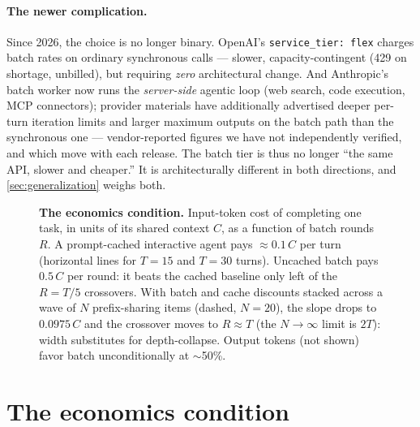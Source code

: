 \documentclass[11pt]{article}
\begin{document}
\paragraph{The newer complication.} Since 2026, the choice is no longer binary. OpenAI's \texttt{service\_tier:\,flex} charges batch rates on ordinary synchronous calls --- slower, capacity-contingent (429 on shortage, unbilled), but requiring \emph{zero} architectural change. And Anthropic's batch worker now runs the \emph{server-side} agentic loop (web search, code execution, MCP connectors); provider materials have additionally advertised deeper per-turn iteration limits and larger maximum outputs on the batch path than the synchronous one --- vendor-reported figures we have not independently verified, and which move with each release. The batch tier is thus no longer ``the same API, slower and cheaper.'' It is architecturally different in both directions, and \cref{sec:generalization} weighs both.

\begin{figure}[!htbp]
\centering

\caption{\textbf{The economics condition.} Input-token cost of completing one task, in units of its shared context $C$, as a function of batch rounds $R$. A prompt-cached interactive agent pays $\approx 0.1\,C$ per turn (horizontal lines for $T{=}15$ and $T{=}30$ turns). Uncached batch pays $0.5\,C$ per round: it beats the cached baseline only left of the $R{=}T/5$ crossovers. With batch and cache discounts stacked across a wave of $N$ prefix-sharing items (dashed, $N{=}20$), the slope drops to $0.0975\,C$ and the crossover moves to $R \approx T$ (the $N \to \infty$ limit is $2T$): width substitutes for depth-collapse. Output tokens (not shown) favor batch unconditionally at $\sim$50\%.}
\label{fig:economics}
\end{figure}

\section{The economics condition}
\label{sec:economics}
\end{document}
